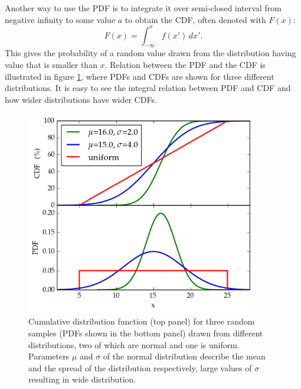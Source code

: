 \documentclass[english, oneside]{HYgradu}
\begin{document}
Another way to use the PDF is to integrate it over semi-closed interval from negative infinity to some value $a$ to obtain the CDF, often denoted with $F(x)$:
\begin{equation}
	F(x) = \int_{-\infty}^x f(x') \,dx'.
\end{equation}	
This gives the probability of a random value drawn from the distribution having value that is smaller than $x$. Relation between the PDF and the CDF is illustrated in figure \ref{fig:cdf}, where PDFs and CDFs are shown for three different distributions. It is easy to see the integral relation between PDF and CDF and how wider distributions have wider CDFs. \citep{htk}

\begin{figure}
   \reversemarginpar
   \centering
   \includegraphics[width=0.9\textwidth]{kuvat/cdf.png}
   \caption{Cumulative distribution function (top panel) for three random samples (PDFs shown in the bottom panel) drawn from different distributions, two of which are normal and one is uniform. Parameters $\mu$ and $\sigma$ of the normal distribution describe the mean and the spread of the distribution respectively, large values of $\sigma$ resulting in wide distribution.}
   \label{fig:cdf}

\end{figure}
\end{document}
